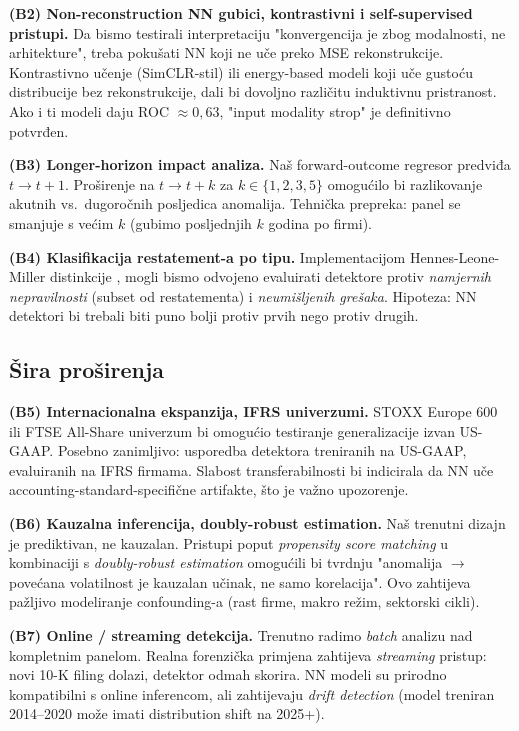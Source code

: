 \documentclass[diplomskirad,authoryear]{fer}
\begin{document}
\textbf{(B2) Non-reconstruction NN gubici, kontrastivni i self-supervised pristupi.} Da bismo testirali interpretaciju "konvergencija je zbog modalnosti, ne arhitekture", treba pokušati NN koji ne uče preko MSE rekonstrukcije. Kontrastivno učenje (SimCLR-stil) ili energy-based modeli koji uče gustoću distribucije bez rekonstrukcije, dali bi dovoljno različitu induktivnu pristranost. Ako i ti modeli daju ROC $\approx 0{,}63$, "input modality strop" je definitivno potvrđen.

\textbf{(B3) Longer-horizon impact analiza.} Naš forward-outcome regresor predviđa $t \to t+1$. Proširenje na $t \to t+k$ za $k \in \{1, 2, 3, 5\}$ omogućilo bi razlikovanje akutnih vs.\ dugoročnih posljedica anomalija. Tehnička prepreka: panel se smanjuje s većim $k$ (gubimo posljednjih $k$ godina po firmi).

\textbf{(B4) Klasifikacija restatement-a po tipu.} Implementacijom Hennes-Leone-Miller distinkcije \citep{hennes2008}, mogli bismo odvojeno evaluirati detektore protiv \emph{namjernih nepravilnosti} (subset od restatementa) i \emph{neumišljenih grešaka}. Hipoteza: NN detektori bi trebali biti puno bolji protiv prvih nego protiv drugih.

\subsection{Šira proširenja}

\textbf{(B5) Internacionalna ekspanzija, IFRS univerzumi.} STOXX Europe 600 ili FTSE All-Share univerzum bi omogućio testiranje generalizacije izvan US-GAAP. Posebno zanimljivo: usporedba detektora treniranih na US-GAAP, evaluiranih na IFRS firmama. Slabost transferabilnosti bi indicirala da NN uče accounting-standard-specifične artifakte, što je važno upozorenje.

\textbf{(B6) Kauzalna inferencija, doubly-robust estimation.} Naš trenutni dizajn je prediktivan, ne kauzalan. Pristupi poput \emph{propensity score matching} u kombinaciji s \emph{doubly-robust estimation} omogućili bi tvrdnju "anomalija $\to$ povećana volatilnost je kauzalan učinak, ne samo korelacija". Ovo zahtijeva pažljivo modeliranje confounding-a (rast firme, makro režim, sektorski cikli).

\textbf{(B7) Online / streaming detekcija.} Trenutno radimo \emph{batch} analizu nad kompletnim panelom. Realna forenzička primjena zahtijeva \emph{streaming} pristup: novi 10-K filing dolazi, detektor odmah skorira. NN modeli su prirodno kompatibilni s online inferencom, ali zahtijevaju \emph{drift detection} (model treniran 2014--2020 može imati distribution shift na 2025+).
\end{document}
